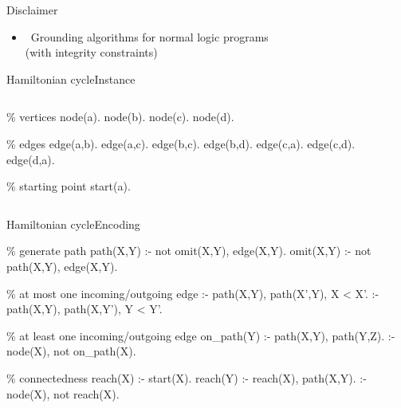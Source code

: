 \begin{frame}{Disclaimer}
  \bigskip
  \begin{itemize}
  \item {} \ Grounding algorithms for normal logic programs\\(with integrity constraints)
  \end{itemize}
\end{frame}
\begin{frame}{Hamiltonian cycle}{Instance}
  \vfill
  \begin{columns}
    \begin{column}{0.4\textwidth}
      \begin{minipage}{.4\textwidth}
      \begin{semiverbatim}
{\color{comment}\% vertices}
node(a).  node(b).
node(c).  node(d).

{\color{comment}\% edges}
edge(a,b).  edge(a,c).
edge(b,c).  edge(b,d).
edge(c,a).  edge(c,d).
edge(d,a).

{\color{comment}\% starting point}
start(a).
      \end{semiverbatim}
    \end{minipage}
    \end{column}
    \begin{column}{0.4\textwidth}
      \centering
      \Graph
    \end{column}
  \end{columns}
\end{frame}
\begin{frame}{Hamiltonian cycle}{Encoding}
  \vfill
\begin{SemiVerbatim}[\small]{.9}
{\color{comment}\% generate path}
path(X,Y) :- not omit(X,Y), edge(X,Y).
omit(X,Y) :- not path(X,Y), edge(X,Y).

{\color{comment}\% at most one incoming/outgoing edge}
:- path(X,Y), path(X',Y), X < X'.
:- path(X,Y), path(X,Y'), Y < Y'.

{\color{comment}\% at least one incoming/outgoing edge}
on_path(Y) :- path(X,Y), path(Y,Z).
:- node(X), not on_path(X).

{\color{comment}\% connectedness}
reach(X) :- start(X).
reach(Y) :- reach(X), path(X,Y).
:- node(X), not reach(X).
\end{SemiVerbatim}
\end{frame}
